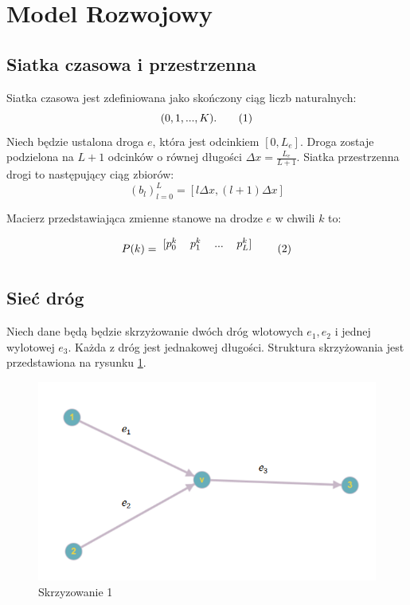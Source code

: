\documentclass[12pt]{book}
\newcommand\addtag{\refstepcounter{equation}\tag{\theequation}}
\begin{document}
\section{Model Rozwojowy}
\subsection{Siatka czasowa i przestrzenna}
Siatka czasowa jest zdefiniowana jako skończony ciąg liczb naturalnych:
\[(0,1,...,K). \addtag \]
Niech będzie ustalona droga $e$, która jest odcinkiem $[0,L_e]$. Droga zostaje podzielona na $L+1$ odcinków o równej długości $\Delta x=\frac{L_e}{L+1}$. Siatka przestrzenna drogi to następujący ciąg zbiorów:
\[(b_l)_{l=0}^{L}=[l\Delta x,(l+1)\Delta x]\]

Macierz przedstawiająca zmienne stanowe na drodze $e$ w chwili $k$ to:

\begin{equation*}
  P(k)=
  \begin{blockarray}{*{4}{c} l}
    \begin{block}{*{4}{>{$\footnotesize}c<{$}} l}
    \end{block}
    \begin{block}{[*{4}{c}]>{$\footnotesize}l<{$}}
       p_0^k & p_1^k & ... & p_L^k  \\
    \end{block}
  \end{blockarray} \addtag \label{matrix:zmienne_stanowe}
\end{equation*}


\subsection{Sieć dróg}
Niech dane będą będzie skrzyżowanie dwóch dróg wlotowych $e_1,e_2$ i jednej wylotowej $e_3$. Każda z dróg jest jednakowej długości. Struktura skrzyżowania jest przedstawiona na rysunku \ref{fig:skrz_1}.
\begin{figure}[H]
  \centering
    \includegraphics[width=14cm]{skrz_1}
 \caption{Skrzyzowanie 1}
 \label{fig:skrz_1}
\end{figure}
\end{document}
